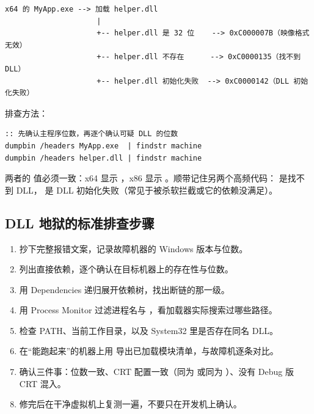 \begin{lstlisting}[style=textstyle]
x64 的 MyApp.exe --> 加载 helper.dll
                     |
                     +-- helper.dll 是 32 位    --> 0xC000007B（映像格式无效）
                     +-- helper.dll 不存在      --> 0xC0000135（找不到 DLL）
                     +-- helper.dll 初始化失败  --> 0xC0000142（DLL 初始化失败）
\end{lstlisting}

排查方法：

\begin{lstlisting}[style=shellstyle]
:: 先确认主程序位数，再逐个确认可疑 DLL 的位数
dumpbin /headers MyApp.exe  | findstr machine
dumpbin /headers helper.dll | findstr machine
\end{lstlisting}

两者的  值必须一致：x64 显示 ，x86 显示 。顺带记住另两个高频代码： 是找不到 DLL， 是 DLL 初始化失败（常见于被杀软拦截或它的依赖没满足）。
\subsection{DLL 地狱的标准排查步骤}
\begin{enumerate}
  \item 抄下完整报错文案，记录故障机器的 Windows 版本与位数。
  \item {} 列出直接依赖，逐个确认在目标机器上的存在性与位数。
  \item 用 Dependencies 递归展开依赖树，找出断链的那一级。
  \item 用 Process Monitor 过滤进程名与 ，看加载器实际搜索过哪些路径。
  \item 检查 PATH、当前工作目录，以及 System32 里是否存在同名 DLL。
  \item 在“能跑起来”的机器上用  导出已加载模块清单，与故障机逐条对比。
  \item 确认三件事：位数一致、CRT 配置一致（同为  或同为 ）、没有 Debug 版 CRT 混入。
  \item 修完后在干净虚拟机上复测一遍，不要只在开发机上确认。
\end{enumerate}
